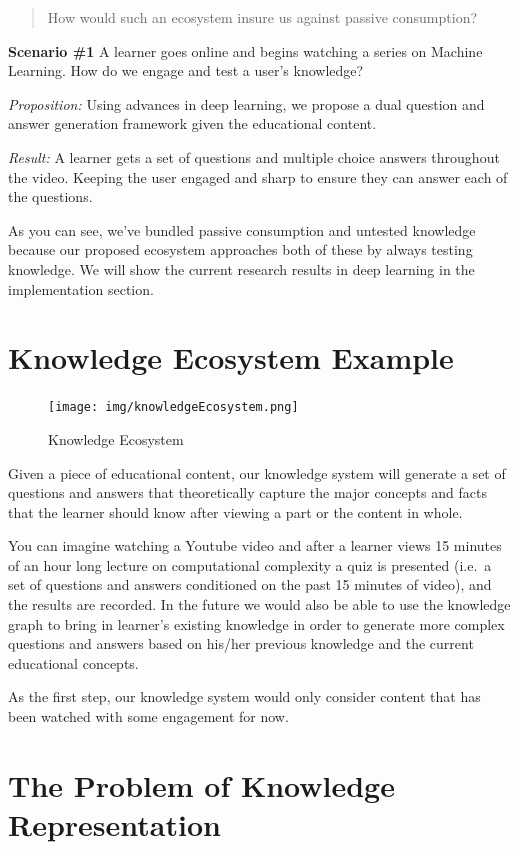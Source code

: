 \documentclass{acm_proc_article-sp}
\begin{document}
\begin{quote}
How would such an ecosystem insure us against passive consumption?
\end{quote}

\textbf{Scenario \#1} A learner goes online and begins watching a series
on Machine Learning. How do we engage and test a user's knowledge?

\emph{Proposition:} Using advances in deep learning, we propose a dual
question and answer generation framework given the educational content.

\emph{Result:} A learner gets a set of questions and multiple choice
answers throughout the video. Keeping the user engaged and sharp to
ensure they can answer each of the questions.

As you can see, we've bundled passive consumption and untested knowledge
because our proposed ecosystem approaches both of these by always
testing knowledge. We will show the current research results in deep
learning in the implementation section.

\section{Knowledge Ecosystem Example}\label{knowledge-ecosystem-example}

\begin{figure}
\centering
\texttt{[image: img/knowledgeEcosystem.png]}
\caption{Knowledge Ecosystem}
\end{figure}

Given a piece of educational content, our knowledge system will generate
a set of questions and answers that theoretically capture the major
concepts and facts that the learner should know after viewing a part or
the content in whole.

You can imagine watching a Youtube video and after a learner views 15
minutes of an hour long lecture on computational complexity a quiz is
presented (i.e.~a set of questions and answers conditioned on the past
15 minutes of video), and the results are recorded. In the future we
would also be able to use the knowledge graph to bring in learner's
existing knowledge in order to generate more complex questions and
answers based on his/her previous knowledge and the current educational
concepts.

As the first step, our knowledge system would only consider content that
has been watched with some engagement for now.

\section{The Problem of Knowledge
Representation}\label{the-problem-of-knowledge-representation}
\end{document}
